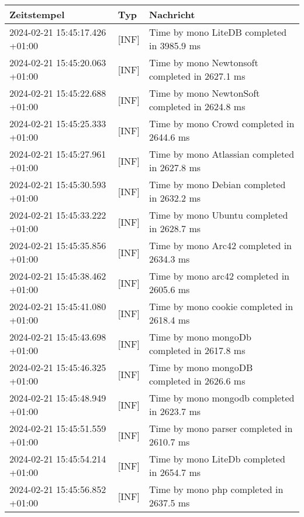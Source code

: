         {
            {\small
                \begin{tabularx}{\textwidth}{|l|l|X|}
                    \hline
                    \textbf{Zeitstempel} & \textbf{Typ} & \textbf{Nachricht} \\
                    \hline
                    \endhead
                    2024-02-21 15:45:17.426 +01:00 & [INF] & Time by mono LiteDB completed in 3985.9 ms \\
                    2024-02-21 15:45:20.063 +01:00 & [INF] & Time by mono Newtonsoft completed in 2627.1 ms \\
                    2024-02-21 15:45:22.688 +01:00 & [INF] & Time by mono NewtonSoft completed in 2624.8 ms \\
                    2024-02-21 15:45:25.333 +01:00 & [INF] & Time by mono Crowd completed in 2644.6 ms \\
                    2024-02-21 15:45:27.961 +01:00 & [INF] & Time by mono Atlassian completed in 2627.8 ms \\
                    2024-02-21 15:45:30.593 +01:00 & [INF] & Time by mono Debian completed in 2632.2 ms \\
                    2024-02-21 15:45:33.222 +01:00 & [INF] & Time by mono Ubuntu completed in 2628.7 ms \\
                    2024-02-21 15:45:35.856 +01:00 & [INF] & Time by mono Arc42 completed in 2634.3 ms \\
                    2024-02-21 15:45:38.462 +01:00 & [INF] & Time by mono arc42 completed in 2605.6 ms \\
                    2024-02-21 15:45:41.080 +01:00 & [INF] & Time by mono cookie completed in 2618.4 ms \\
                    2024-02-21 15:45:43.698 +01:00 & [INF] & Time by mono mongoDb completed in 2617.8 ms \\
                    2024-02-21 15:45:46.325 +01:00 & [INF] & Time by mono mongoDB completed in 2626.6 ms \\
                    2024-02-21 15:45:48.949 +01:00 & [INF] & Time by mono mongodb completed in 2623.7 ms \\
                    2024-02-21 15:45:51.559 +01:00 & [INF] & Time by mono parser completed in 2610.7 ms \\
                    2024-02-21 15:45:54.214 +01:00 & [INF] & Time by mono LiteDb completed in 2654.7 ms \\
                    2024-02-21 15:45:56.852 +01:00 & [INF] & Time by mono php completed in 2637.5 ms \\

\end{tabularx}}}
